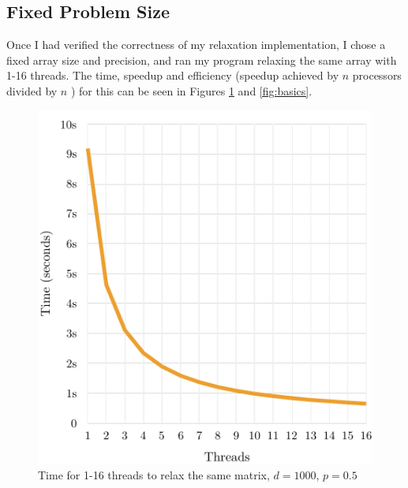 \documentclass[12pt]{article}
\begin{document}
\subsection{Fixed Problem Size}
Once I had verified the correctness of my relaxation implementation, I chose a fixed array size and precision, and ran my program relaxing the same array with 1-16 threads. The time, speedup and efficiency (speedup achieved by $n$ processors divided by $n$ \citep{speedup}) for this can be seen in Figures \ref{fig:basict} and \ref{fig:basics}. 
\begin{figure}[!htb]
    \begin{minipage}{.46\textwidth}
        \hspace{-0.8cm}\includegraphics[width=1.1\textwidth]{img/basic-threads-time.pdf}
        \centering\caption{Time for 1-16 threads to relax the same matrix, $d=1000$, $p=0.5$}
        \label{fig:basict}
    \end{minipage}\hspace{0.4cm}
    \begin{minipage}{0.53\textwidth}

\end{minipage}
\end{figure}
\end{document}
